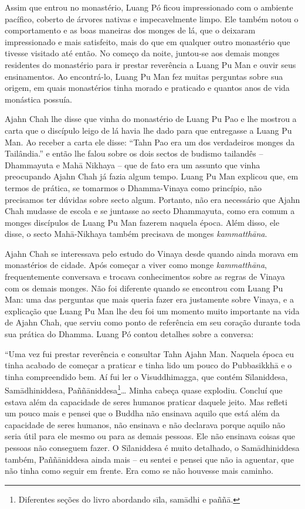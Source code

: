 Assim que entrou no monastério, Luang Pó ficou impressionado com o
ambiente pacífico, coberto de árvores nativas e impecavelmente limpo.
Ele também notou o comportamento e as boas maneiras dos monges de lá,
que o deixaram impressionado e mais satisfeito, mais do que em qualquer
outro monastério que tivesse visitado até então. No começo da noite,
juntou-se aos demais monges residentes do monastério para ir prestar
reverência a Luang Pu Man e ouvir seus ensinamentos. Ao encontrá-lo,
Luang Pu Man fez muitas perguntas sobre sua origem, em quais monastérios
tinha morado e praticado e quantos anos de vida monástica possuía.

Ajahn Chah lhe disse que vinha do monastério de Luang Pu Pao e lhe
mostrou a carta que o discípulo leigo de lá havia lhe dado para que
entregasse a Luang Pu Man. Ao receber a carta ele disse: ``Tahn Pao era
um dos verdadeiros monges da Tailândia.'' e então lhe falou sobre os
dois sectos de budismo tailandês -- Dhammayuta e Mahā Nikhaya -- que de
fato era um assunto que vinha preocupando Ajahn Chah já fazia algum
tempo. Luang Pu Man explicou que, em termos de prática, se tomarmos o
Dhamma-Vinaya como princípio, não precisamos ter dúvidas sobre secto
algum. Portanto, não era necessário que Ajahn Chah mudasse de escola e
se juntasse ao secto Dhammayuta, como era comum a monges discípulos de
Luang Pu Man fazerem naquela época. Além disso, ele disse, o secto
Mahā-Nikhaya também precisava de monges \emph{kammatthāna}.

Ajahn Chah se interessava pelo estudo do Vinaya desde quando ainda
morava em monastérios de cidade. Após começar a viver como monge
\emph{kammatthāna}, frequentemente conversava e trocava conhecimentos
sobre as regras de Vinaya com os demais monges. Não foi diferente quando
se encontrou com Luang Pu Man: uma das perguntas que mais queria fazer
era justamente sobre Vinaya, e a explicação que Luang Pu Man lhe deu foi
um momento muito importante na vida de Ajahn Chah, que serviu como ponto
de referência em seu coração durante toda sua prática do Dhamma. Luang
Pó contou detalhes sobre a conversa:

``Uma vez fui prestar reverência e consultar Tahn Ajahn Man. Naquela
época eu tinha acabado de começar a praticar e tinha lido um pouco do
Pubbasikkhā e o tinha compreendido bem. Aí fui ler o Visuddhimagga, que
contém Sīlaniddesa, Samādhiniddesa, Paññāniddesa\footnote{Diferentes
  seções do livro abordando sīla, samādhi e paññā.}\ldots{} Minha cabeça
quase explodiu. Concluí que estava além da capacidade de seres humanos
praticar daquele jeito. Mas refleti um pouco mais e pensei que o Buddha
não ensinava aquilo que está além da capacidade de seres humanos, não
ensinava e não declarava porque aquilo não seria útil para ele mesmo ou
para as demais pessoas. Ele não ensinava coisas que pessoas não
conseguem fazer. O Sīlaniddesa é muito detalhado, o Samādhiniddesa
também, Paññāniddesa ainda mais -- eu sentei e pensei que não ia
aguentar, que não tinha como seguir em frente. Era como se não houvesse
mais caminho.

